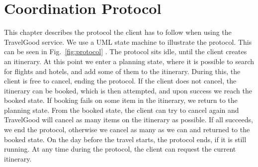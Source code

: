 \chapter{Coordination Protocol}
This chapter describes the protocol the client has to follow when using the TravelGood service. We use a UML state machine to illustrate the protocol. This can be seen in Fig.~\ref{fig:protocol} . The protocol sits idle, until the client creates an itinerary. At this point we enter a planning state, where it is possible to search for flights and hotels, and add some of them to the itinerary. During this, the client is free to cancel, ending the protocol. If the client does not cancel, the itinerary can be booked, which is then attempted, and upon success we reach the booked state. If booking fails on some item in the itinerary, we return to the planning state. From the booked state, the client can try to cancel again and TravelGood will cancel as many items on the itinerary as possible. If all succeeds, we end the protocol, otherwise we cancel as many as we can and returned to the booked state. On the day before the travel starts, the protocol ends, if it is still running. At any time during the protocol, the client can request the current itinerary.